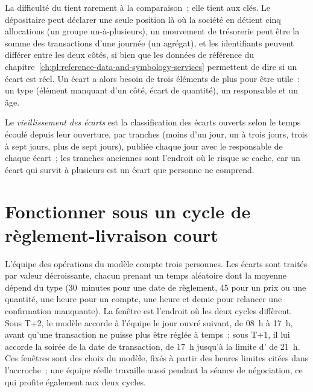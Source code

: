 \label{lst:pl:post-trade-systems:recon}

La difficulté du  tient rarement à la comparaison~; elle tient aux clés. Le dépositaire peut déclarer une seule position là où la société en détient cinq
allocations (un groupe un-à-plusieurs), un mouvement de trésorerie peut être la somme des transactions d'une journée (un agrégat), et les identifiants peuvent différer entre les deux
côtés, si bien que les données de référence du chapitre~\ref{ch:pl:reference-data-and-symbology-services} permettent de dire si un écart est réel. Un écart a alors besoin de trois éléments de plus
pour être utile~: un type (élément manquant d'un côté, écart de quantité), un responsable et un âge.

\begin{definition}\label{def:pl:post-trade-systems:ageing}
Le \emph{vieillissement des écarts} est la classification des écarts ouverts selon le temps écoulé depuis leur ouverture, par tranches (moins d'un jour, un
à trois jours, trois à sept jours, plus de sept jours), publiée chaque jour avec le responsable de chaque écart~; les tranches anciennes sont l'endroit où le risque se cache, car un écart
qui survit à plusieurs  est un écart que personne ne comprend.
\end{definition}

\section{Fonctionner sous un cycle de règlement-livraison court}

L'équipe des opérations du modèle compte trois personnes. Les écarts sont traités par valeur décroissante, chacun prenant un temps aléatoire dont la moyenne dépend du type
(30~minutes pour une date de règlement, 45 pour un prix ou une quantité, une heure pour un compte, une heure et demie pour relancer une confirmation manquante). La
fenêtre est l'endroit où les deux cycles diffèrent. Sous T+2, le modèle accorde à l'équipe le jour ouvré suivant, de 08~h à 17~h, avant qu'une transaction ne puisse plus être
réglée à temps~; sous T+1, il lui accorde la soirée de la date de transaction, de 17~h jusqu'à la limite d' de 21~h. Ces fenêtres sont des choix du modèle,
fixés à partir des heures limites citées dans l'accroche~; une équipe réelle travaille aussi pendant la séance de négociation, ce qui profite également aux deux cycles.

